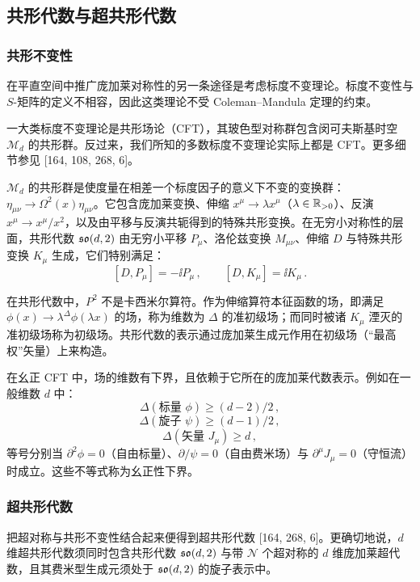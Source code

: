 \subsection{共形代数与超共形代数}

\subsubsection*{共形不变性}

在平直空间中推广庞加莱对称性的另一条途径是考虑标度不变理论。标度不变性与 $S$-矩阵的定义不相容，因此这类理论不受 Coleman–Mandula 定理的约束。

一大类标度不变理论是共形场论（CFT），其玻色型对称群包含闵可夫斯基时空 $\mathcal{M}_d$ 的共形群。反过来，我们所知的多数标度不变理论实际上都是 CFT。更多细节参见 [164, 108, 268, 6]。

\begin{definition}[17.8] $\mathcal{M}_d$ 的共形群是使度量在相差一个标度因子的意义下不变的变换群：$\eta_{\mu\nu}\to\Omega^2(x)\eta_{\mu\nu}$。它包含庞加莱变换、伸缩 $x^\mu\to\lambda x^\mu$（$\lambda\in\mathbb{R}_{>0}$）、反演 $x^\mu\to x^\mu/x^2$，以及由平移与反演共轭得到的特殊共形变换。在无穷小对称性的层面，共形代数 $\mathfrak{so}(d,2)$ 由无穷小平移 $P_\mu$、洛伦兹变换 $M_{\mu\nu}$、伸缩 $D$ 与特殊共形变换 $K_\mu$ 生成，它们特别满足：
\[
[D,P_\mu]=-\ii P_\mu\,,\qquad [D,K_\mu]=\ii K_\mu\,.
\]
\end{definition}

在共形代数中，$P^2$ 不是卡西米尔算符。作为伸缩算符本征函数的场，即满足 $\phi(x)\to\lambda^\Delta\phi(\lambda x)$ 的场，称为维数为 $\Delta$ 的准初级场；而同时被诸 $K_\mu$ 湮灭的准初级场称为初级场。共形代数的表示通过庞加莱生成元作用在初级场（“最高权”矢量）上来构造。

在幺正 CFT 中，场的维数有下界，且依赖于它所在的庞加莱代数表示。例如在一般维数 $d$ 中：
\[
\Delta(\text{标量 }\phi)\ge(d-2)/2\,,
\]
\[
\Delta(\text{旋子 }\psi)\ge(d-1)/2\,,
\]
\[
\Delta(\text{矢量 }J_\mu)\ge d\,,
\]
等号分别当 $\partial^2\phi=0$（自由标量）、$\partial\!\!\!/\psi=0$（自由费米场）与 $\partial^\mu J_\mu=0$（守恒流）时成立。这些不等式称为幺正性下界。

\subsubsection*{超共形代数}

把超对称与共形不变性结合起来便得到超共形代数 [164, 268, 6]。更确切地说，$d$ 维超共形代数须同时包含共形代数 $\mathfrak{so}(d,2)$ 与带 $\mathcal{N}$ 个超对称的 $d$ 维庞加莱超代数，且其费米型生成元须处于 $\mathfrak{so}(d,2)$ 的旋子表示中。

